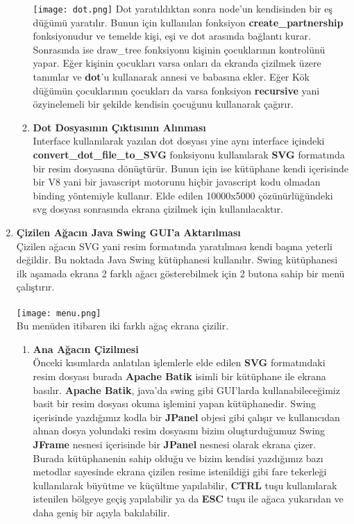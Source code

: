 \documentclass[conference]{IEEEtran}
\begin{document}
\begin{enumerate}
\begin{enumerate}
        \texttt{[image: dot.png]}
        Dot yaratıldıktan sonra node'un kendisinden bir eş düğümü yaratılır. Bunun için kullanılan fonksiyon \textbf{create\_partnership} fonksiyonudur ve temelde kişi, eşi ve dot arasında bağlantı kurar. Sonrasında ise draw\_tree fonksiyonu kişinin çocuklarının kontrolünü yapar. Eğer kişinin çocukları varsa onları da ekranda çizilmek üzere tanımlar ve \textbf{dot}'u kullanarak annesi ve babasına ekler. Eğer Kök düğümün çocuklarının çocukları da varsa fonksiyon \textbf{recursive} yani özyinelemeli bir şekilde kendisin çocuğunu kullanarak çağırır.\\
        \item \textbf{Dot Dosyasının Çıktısının Alınması}\\
        Interface kullanılarak yazılan dot dosyası yine aynı interface içindeki \textbf{convert\_dot\_file\_to\_SVG} fonksiyonu kullanılarak \textbf{SVG} formatında bir resim dosyasına dönüştürür. Bunun için ise kütüphane kendi içerisinde bir V8 yani bir javascript motorunu hiçbir javascript kodu olmadan binding yöntemiyle kullanır. Elde edilen 10000x5000 çözünürlüğündeki svg dosyası sonrasında ekrana çizilmek için kullanılacaktır.
    \end{enumerate}
    \item \textbf{Çizilen Ağacın Java Swing GUI'a Aktarılması}\\
    Çizilen ağacın SVG yani resim formatında yaratılması kendi başına yeterli değildir. Bu noktada Java Swing kütüphanesi kullanılır. Swing kütüphanesi ilk aşamada ekrana 2 farklı ağacı gösterebilmek için 2 butona sahip bir menü çalıştırır.\\\\
    \texttt{[image: menu.png]}\\
    Bu menüden itibaren iki farklı ağaç ekrana çizilir.
    \begin{enumerate}
        \item \textbf{Ana Ağacın Çizilmesi}\\
        Önceki kısımlarda anlatılan işlemlerle elde edilen \textbf{SVG} formatındaki resim dosyası burada \textbf{Apache Batik} isimli bir kütüphane ile ekrana basılır. \textbf{Apache Batik}, java'da swing gibi GUI'larda kullanabileceğimiz basit bir  resim dosyası okuma işlemini yapan kütüphanedir. Swing içerisinde yazdığımız kodla bir \textbf{JPanel} objesi gibi çalışır ve kullanıcıdan alınan dosya yolundaki resim dosyasını bizim oluşturduğumuz Swing \textbf{JFrame} nesnesi içerisinde bir \textbf{JPanel} nesnesi olarak ekrana çizer. Burada kütüphanenin sahip olduğu ve bizim kendisi yazdığımız bazı metodlar sayesinde ekrana çizilen resime istenildiği gibi fare tekerleği kullanılarak büyütme ve küçültme yapılabilir, \textbf{CTRL} tuşu kullanılarak istenilen bölgeye geçiş yapılabilir ya da \textbf{ESC} tuşu ile ağaca yukarıdan ve daha geniş bir açıyla bakılabilir.

\end{enumerate}
\end{enumerate}
\end{document}
